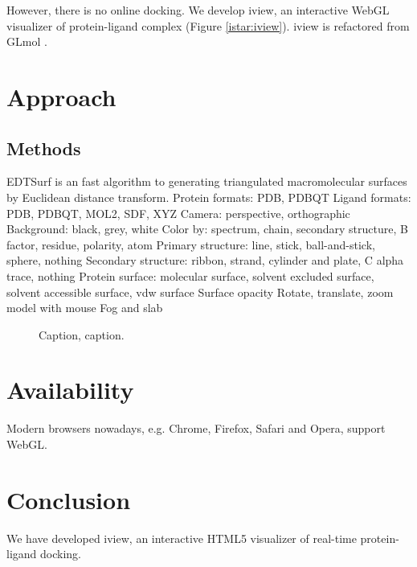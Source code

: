 \documentclass{bioinfo}
\begin{document}
However, there is no online docking. We develop iview, an interactive WebGL visualizer of protein-ligand complex (Figure \ref{istar:iview}). iview is refactored from GLmol \citep{1319}.

\section{Approach}


\begin{methods}
\section{Methods}

EDTSurf \citep{1297} is an fast algorithm to generating triangulated macromolecular surfaces by Euclidean distance transform.
Protein formats: PDB, PDBQT
Ligand formats: PDB, PDBQT, MOL2, SDF, XYZ
Camera: perspective, orthographic
Background: black, grey, white
Color by: spectrum, chain, secondary structure, B factor, residue, polarity, atom
Primary structure: line, stick, ball-and-stick, sphere, nothing
Secondary structure: ribbon, strand, cylinder and plate, C alpha trace, nothing
Protein surface: molecular surface, solvent excluded surface, solvent accessible surface, vdw surface
Surface opacity
Rotate, translate, zoom model with mouse
Fog and slab

\end{methods}

\begin{figure}[!tpb]%
\caption{Caption, caption.}\label{fig:01}
\end{figure}

\section{Availability}

Modern browsers nowadays, e.g. Chrome, Firefox, Safari and Opera, support WebGL.

\section{Conclusion}

We have developed iview, an interactive HTML5 visualizer of real-time protein-ligand docking.


%
%
%
%
%
%


\end{document}

